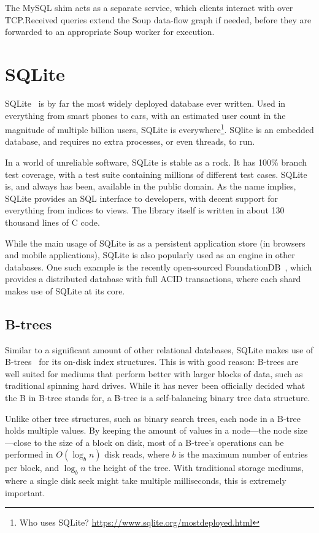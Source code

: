 The MySQL shim acts as a separate service, which clients interact with over
TCP.\@ Received queries extend the Soup data-flow graph if needed, before they
are forwarded to an appropriate Soup worker for execution.

\section{SQLite}\label{sec:sqlite}
SQLite~\cite{sqlite} is by far the most widely deployed database ever written.
Used in everything from smart phones to cars, with an estimated user count in
the magnitude of multiple billion users, SQLite is everywhere\footnote{Who
uses SQLite? \url{https://www.sqlite.org/mostdeployed.html}}. SQlite is an
embedded database, and requires no extra processes, or even threads, to run.

In a world of unreliable software, SQLite is stable as a rock. It has 100\%
branch test coverage, with a test suite containing millions of different test
cases. SQLite is, and always has been, available in the public domain. As the
name implies, SQLite provides an SQL interface to developers, with decent support
for everything from indices to views. The library itself is written in about 130
thousand lines of C code.

While the main usage of SQLite is as a persistent application store (\eg in
browsers and mobile applications), SQLite is also popularly used as an engine in
other databases. One such example is the recently open-sourced
FoundationDB~\cite{foundation}, which provides a distributed database with full
ACID transactions, where each shard makes use of SQLite at its core.

\subsection{B-trees}\label{sec:btree}
Similar to a significant amount of other relational databases, SQLite makes use
of B-trees~\cite{btree} for its on-disk index structures. This is with good
reason: B-trees are well suited for mediums that perform better with larger
blocks of data, such as traditional spinning hard drives. While it has never
been officially decided what the B in B-tree stands for, a B-tree is a
self-balancing binary tree data structure.

Unlike other tree structures, such as binary search trees, each node in a B-tree
holds multiple values. By keeping the amount of values in a node---the node
size---close to the size of a block on disk, most of a B-tree's operations can
be performed in $ O(\log_b n) $ disk reads, where $ b $ is the maximum number of
entries per block, and $ \log_b n $ the height of the tree. With traditional
storage mediums, where a single disk seek might take multiple milliseconds, this
is extremely important.

